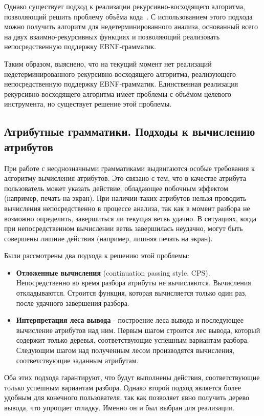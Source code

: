 Однако существует подход к реализации рекурсивно-восходящего алгоритма, позволяющий решить проблему объёма кода~\cite{Non-det-rec-asc}. С использованием этого подхода можно получить алгоритм для недетерминированного анализа, основанный всего на двух взаимно-рекурсивных функциях и позволяющий реализовать непосредственную поддержку EBNF-грамматик.

Таким образом, выяснено, что на текущий момент нет реализаций недетерминированного рекурсивно-восходящего алгоритма, реализующего непосредственную поддержку EBNF-грамматик. Единственная реализация рекурсивно-восходящего алгоритма имеет проблемы с объёмом целевого инструмента, но существует решение этой проблемы.


\subsection{Атрибутные грамматики. Подходы к вычислению атрибутов}

При работе с неоднозначными грамматиками выдвигаются особые требования к алгоритму вычисления атрибутов. Это связано с тем, что в качестве атрибута пользователь может указать действие, обладающее побочным эффектом (например, печать на экран). При наличии таких атрибутов нельзя проводить вычисления непосредственно в процессе анализа, так как в момент разбора не возможно определить, завершиться ли текущая ветвь удачно. В ситуациях, когда при непосредственном вычислении ветвь завершилась неудачно, могут быть совершены лишние действия (например, лишняя печать на экран).

Были рассмотрены два подхода к решению этой проблемы: 
\begin{itemize}

	\item {\bfseries Отложенные вычисления} (continuation passing style, CPS). Непосредственно во время разбора атрибуты не вычисляются. Вычисления откладываются. Строится функция, которая вычисляется только один раз, после удачного завершения разбора.
	
	\item {\bfseries Интерпретация леса вывода} - построение леса вывода и последующее вычисление атрибутов над ним. Первым шагом строится лес вывода, который содержит только деревья, соответствующие успешным вариантам разбора. Следующим шагом над полученным лесом производятся вычисления, соответствующие заданным атрибутам.
	
\end{itemize}

Оба этих подхода гарантируют, что будут выполнены действия, соответствующие только успешным вариантам разбора. Однако второй подход является более удобным для конечного пользователя, так как позволяет явно получить дерево вывода, что упрощает отладку. Именно он и был выбран для реализации.
